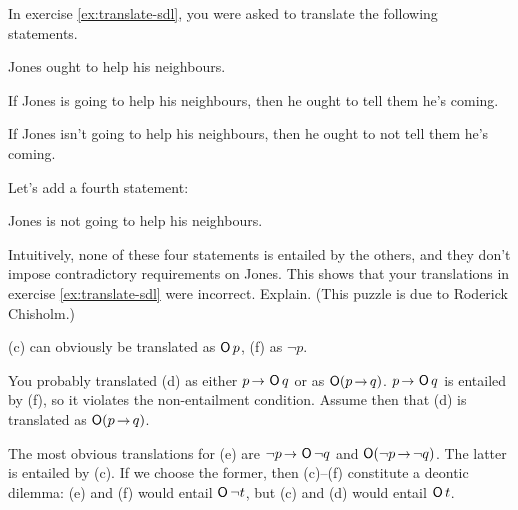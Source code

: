 \begin{exercise}\label{ex:chisholmsparadox}
  In exercise \ref{ex:translate-sdl}, you were asked to translate the following
  statements.
  \begin{exlist}
    \item[(c)] Jones ought to help his neighbours.
    \item[(d)] If Jones is going to help his neighbours, then he ought to tell them
    he's coming.
    \item[(e)] If Jones isn't going to help his neighbours, then he ought to not  tell them he's coming.
  \end{exlist}
  \medskip\noindent%
  Let's add a fourth statement:
  \begin{exlist}
    \item[(f)] Jones is not going to help his neighbours.
  \end{exlist}
  \medskip\noindent%
  Intuitively, none of these four statements is entailed by the others,
  and they don't impose contradictory requirements on Jones. This shows
  that your translations in exercise \ref{ex:translate-sdl} were incorrect.
  Explain. (This puzzle is due to Roderick Chisholm.)
\end{exercise}
\begin{solution}
  (c) can obviously be translated as $\operatorname{\mathsf{O}} p$, (f) as $\neg p$.

  You probably translated (d) as either $p \to \Ob q$ or as $\Ob(p \to q)$.
  $p \to \Ob q$ is entailed by (f), so it violates the non-entailment condition.
  Assume then that (d) is translated as $\Ob(p \to q)$.

  The most obvious translations for (e) are $\neg p \to \Ob\neg q$ and
  $\Ob(\neg p \to \neg q)$. The latter is entailed by (c). If we choose the
  former, then (c)--(f) constitute a deontic dilemma: (e) and (f) would entail
  $\operatorname{\mathsf{O}} \neg t$, but (c) and (d) would entail $\operatorname{\mathsf{O}} t$.
\end{solution}



